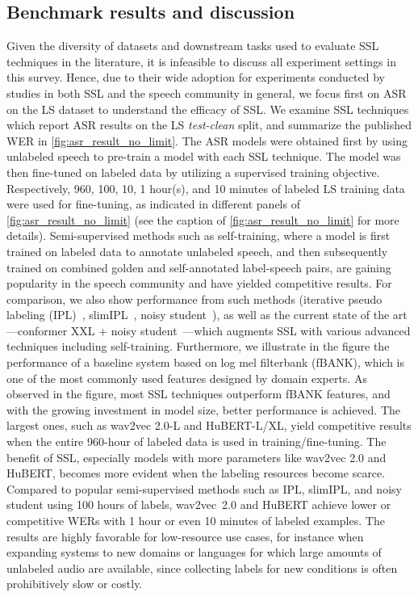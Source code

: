 \subsection{Benchmark results and discussion} \label{sec:benchmark} 
Given the diversity of datasets and downstream tasks used to evaluate SSL
techniques in the literature, it is infeasible to discuss all 
experiment settings in this survey. Hence, due to their wide adoption for
experiments conducted by studies in both SSL and the speech community in
general, we focus first on ASR on the LS dataset to understand the
efficacy of SSL. We examine SSL techniques which report ASR results on the LS
\textit{test-clean} split, and summarize the published WER in
\cref{fig:asr_result_no_limit}. The ASR models were obtained first by using
unlabeled speech to pre-train a model with each SSL technique. The model was
then fine-tuned on labeled data by utilizing a supervised training objective.
Respectively, 960, 100, 10, 1 hour(s), and 10 minutes of labeled LS training data
were used for fine-tuning, as indicated in different panels of
\cref{fig:asr_result_no_limit} (see
the caption of \cref{fig:asr_result_no_limit} for more details).
Semi-supervised methods such as self-training, where a model is first trained
on labeled data to annotate unlabeled speech, and then subsequently trained on
combined golden and self-annotated label-speech pairs, are gaining popularity
in the speech community and have yielded competitive results. For comparison, we also
show performance from such methods (iterative pseudo labeling 
(IPL)~\cite{xu_iterative_2020}, slimIPL~\cite{likhomanenko_slimipl_2021}, noisy 
student~\cite{park_improved_2020}), as well as the current state of the art---conformer XXL + noisy
student~\cite{zhang_pushing_2020}---which augments SSL with various advanced
techniques including self-training. Furthermore, we illustrate in the figure
the performance of a baseline system \cite{yang_superb_2021} based on log mel filterbank (fBANK), which is one of the most commonly used features designed by domain experts.
As observed in the figure, most SSL techniques outperform fBANK
features, and with the growing investment in model size, better performance is
achieved. The largest ones, such as wav2vec 2.0-L and HuBERT-L/XL, yield competitive results 
when the entire 960-hour of labeled data is used in
training/fine-tuning. The benefit of SSL, especially models with more parameters
like wav2vec 2.0 and HuBERT, becomes more evident when the labeling resources
become scarce. Compared to popular semi-supervised methods such as IPL,
slimIPL, and noisy student using 100 hours of labels, wav2vec~2.0 and HuBERT
achieve lower or competitive WERs with 1 hour or even 10 minutes of labeled
examples. The results are highly favorable for low-resource use cases, for instance when
expanding systems to new domains or languages for which large amounts of unlabeled
audio are available, since collecting labels for new conditions is often prohibitively
slow or costly.

